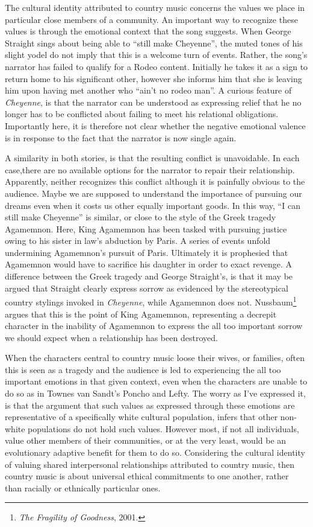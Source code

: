 \documentclass[phdthesis,12pt,final,a4paper]{wuthesis}
\theoremstyle{definition}
\theoremstyle{definition}
\theoremstyle{definition}
\theoremstyle{definition}
\theoremstyle{remark}
\begin{document}
The cultural identity attributed to country music concerns the values we place in particular close members of a community. An important way to recognize these values is through the emotional context that the song suggests. When George Straight sings about being able to ``still make Cheyenne'', the muted tones of his slight yodel do not imply that this is a welcome turn of events. Rather, the song's narrator has failed to qualify for a Rodeo content. Initially he takes it as a sign to return home to his significant other, however she informs him that she is leaving him upon having met another who ``ain't no rodeo man''. A curious feature of \emph{Cheyenne}, is that the narrator can be understood as expressing relief that he no longer has to be conflicted about failing to meet his relational obligations. Importantly here, it is therefore not clear whether the negative emotional valence is in response to the fact that the narrator is now single again.

A similarity in both stories, is that the resulting conflict is unavoidable. In each case,there are no available options for the narrator to repair their relationship. Apparently, neither recognizes this conflict although it is painfully obvious to the audience. Maybe we are supposed to understand the importance of pursuing our dreams even when it costs us other equally important goods. In this way, ``I can still make Cheyenne'' is similar, or close to the style of the Greek tragedy Agamemnon. Here, King Agamemnon has been tasked with pursuing justice owing to his sister in law's abduction by Paris. A series of events unfold undermining Agamemnon's pursuit of Paris. Ultimately it is prophesied that Agamemnon would have to sacrifice his daughter in order to exact revenge. A difference between the Greek tragedy and George Straight's, is that it may be argued that Straight clearly express sorrow as evidenced by the stereotypical country stylings invoked in \emph{Cheyenne}, while Agamemnon does not. Nussbaum\footnote{\emph{The {Fragility} of {Goodness}}, 2001.} argues that this is the point of King Agamemnon, representing a decrepit character in the inability of Agamemnon to express the all too important sorrow we should expect when a relationship has been destroyed.

When the characters central to country music loose their wives, or families, often this is seen as a tragedy and the audience is led to experiencing the all too important emotions in that given context, even when the characters are unable to do so as in Townes van Sandt's Poncho and Lefty. The worry as I've expressed it, is that the argument that such values as expressed through these emotions are representative of a specifically white cultural population, infers that other non-white populations do not hold such values. However most, if not all individuals, value other members of their communities, or at the very least, would be an evolutionary adaptive benefit for them to do so. Considering the cultural identity of valuing shared interpersonal relationships attributed to country music, then country music is about universal ethical commitments to one another, rather than racially or ethnically particular ones.
\end{document}
